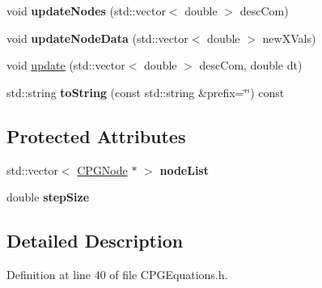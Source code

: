 \begin{DoxyCompactItemize}
\item 
\hypertarget{class_c_p_g_equations_ad3a8395ba38460b34ca09211e9188347}{void {\bfseries update\-Nodes} (std\-::vector$<$ double $>$ desc\-Com)}\label{class_c_p_g_equations_ad3a8395ba38460b34ca09211e9188347}

\item 
\hypertarget{class_c_p_g_equations_aae1cc71d41a788f7b6b7400da585a813}{void {\bfseries update\-Node\-Data} (std\-::vector$<$ double $>$ new\-X\-Vals)}\label{class_c_p_g_equations_aae1cc71d41a788f7b6b7400da585a813}

\item 
void \hyperlink{class_c_p_g_equations_a9978d438b20d3dc5d8cddce6371a287f}{update} (std\-::vector$<$ double $>$ desc\-Com, double dt)
\item 
\hypertarget{class_c_p_g_equations_a5c58c287f27792c2529e422856942f54}{std\-::string {\bfseries to\-String} (const std\-::string \&prefix=\char`\"{}\char`\"{}) const }\label{class_c_p_g_equations_a5c58c287f27792c2529e422856942f54}

\end{DoxyCompactItemize}
\subsection*{Protected Attributes}
\begin{DoxyCompactItemize}
\item 
\hypertarget{class_c_p_g_equations_ab326e8ce8355cab8f0012d2086100628}{std\-::vector$<$ \hyperlink{class_c_p_g_node}{C\-P\-G\-Node} $\ast$ $>$ {\bfseries node\-List}}\label{class_c_p_g_equations_ab326e8ce8355cab8f0012d2086100628}

\item 
\hypertarget{class_c_p_g_equations_a64ccb09813ead979d70cceac249d23b4}{double {\bfseries step\-Size}}\label{class_c_p_g_equations_a64ccb09813ead979d70cceac249d23b4}

\end{DoxyCompactItemize}


\subsection{Detailed Description}


Definition at line 40 of file C\-P\-G\-Equations.\-h.



